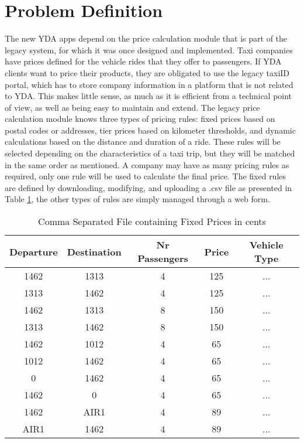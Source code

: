 %
\section{Problem Definition}
The new YDA apps depend on the price calculation module that is part of the legacy system, for which it was once designed and implemented. Taxi companies have prices defined for the vehicle rides that they offer to passengers. If YDA clients want to price their products, they are obligated to use the legacy taxiID portal, which has to store company information in a platform that is not related to YDA. This makes little sense, as much as it is efficient from a technical point of view, as well as being easy to maintain and extend. The legacy price calculation module knows three types of pricing rules: fixed prices based on postal codes or addresses, tier prices based on kilometer thresholds, and dynamic calculations based on the distance and duration of a ride. These rules will be selected depending on the characteristics of a taxi trip, but they will be matched in the same order as mentioned. A company may have as many pricing rules as required, only one rule will be used to calculate the final price. The fixed rules are defined by downloading, modifying, and uploading a .csv file as presented in Table \ref{tab:fixedprices}, the other types of rules are simply managed through a web form.

\begin{table}[htbp!]
	\centering
	\begin{tabular}{c|c|c|c|c}
		\toprule
		Departure & Destination & Nr Passengers & Price & Vehicle Type \\
		\midrule
		1462      & 1313        & 4             & 125   & ...          \\
		1313      & 1462        & 4             & 125   & ...          \\
		1462      & 1313        & 8             & 150   & ...          \\
		1313      & 1462        & 8             & 150   & ...          \\
		1462      & 1012        & 4             & 65    & ...          \\
		1012      & 1462        & 4             & 65    & ...          \\
		0         & 1462        & 4             & 65    & ...          \\
		1462      & 0           & 4             & 65    & ...          \\
		1462      & AIR1        & 4             & 89    & ...          \\
		AIR1      & 1462        & 4             & 89    & ...          \\
		\bottomrule
	\end{tabular}
	\caption[Legacy CSV Pricing Definition File]{Comma Separated File containing Fixed Prices in cents}
	\label{tab:fixedprices}
\end{table}

